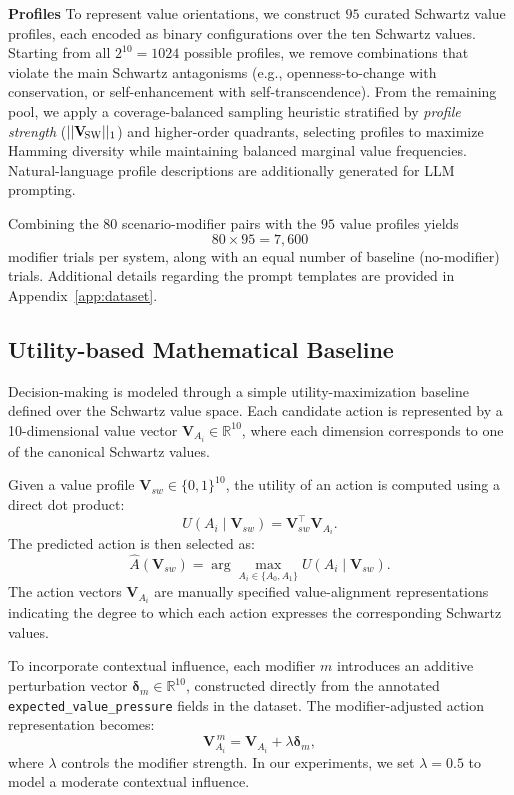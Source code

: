 \documentclass[11pt]{article}
\newcommand{\Vsw}{\mathbf{V}_{\!\textsc{SW}}}
\begin{document}
\textbf{Profiles} To represent value orientations, we construct $95$ curated Schwartz value profiles, each encoded as binary configurations over the ten Schwartz values. Starting from all \(2^{10}=1024\) possible profiles, we remove combinations that violate the main Schwartz antagonisms (e.g., openness-to-change with conservation, or self-enhancement with self-transcendence). From the remaining pool, we apply a coverage-balanced sampling heuristic stratified by \emph{profile strength} (\(||\Vsw||_1\)) and higher-order quadrants, selecting profiles to maximize Hamming diversity while maintaining balanced marginal value frequencies. 
Natural-language profile descriptions are additionally generated for LLM prompting.

Combining the $80$ scenario-modifier pairs with the $95$ value profiles yields
\[
80 \times 95 = 7{,}600
\]
modifier trials per system, along with an equal number of baseline (no-modifier) trials. Additional details regarding the prompt templates are provided in Appendix~\ref{app:dataset}.

\subsection{Utility-based Mathematical Baseline}

Decision-making is modeled through a simple utility-maximization baseline defined over the Schwartz value space.
Each candidate action is represented by a 10-dimensional value vector
$\mathbf{V}_{A_i} \in \mathbb{R}^{10}$,
where each dimension corresponds to one of the canonical Schwartz values.

Given a value profile
$\mathbf{V}_{sw} \in \{0,1\}^{10}$,
the utility of an action is computed using a direct dot product:
\[
U(A_i \mid \mathbf{V}_{sw})
=
\mathbf{V}_{sw}^{\top}\mathbf{V}_{A_i}.
\]
The predicted action is then selected as:
\[
\hat{A}(\mathbf{V}_{sw})
=
\arg\max_{A_i \in \{A_0,A_1\}}
U(A_i \mid \mathbf{V}_{sw}).
\]
The action vectors $\mathbf{V}_{A_i}$ are manually specified value-alignment representations indicating the degree to which each action expresses the corresponding Schwartz values.

To incorporate contextual influence, each modifier $m$
introduces an additive perturbation vector
$\boldsymbol{\delta}_m \in \mathbb{R}^{10}$,
constructed directly from the annotated
\texttt{expected\_value\_pressure} fields in the dataset. The modifier-adjusted action representation becomes:
\[
\mathbf{V}_{A_i}^{\,m}
=
\mathbf{V}_{A_i}
+
\lambda \boldsymbol{\delta}_m,
\]
where $\lambda$ controls the modifier strength.
In our experiments, we set $\lambda = 0.5$ to model a moderate contextual influence.
\end{document}
